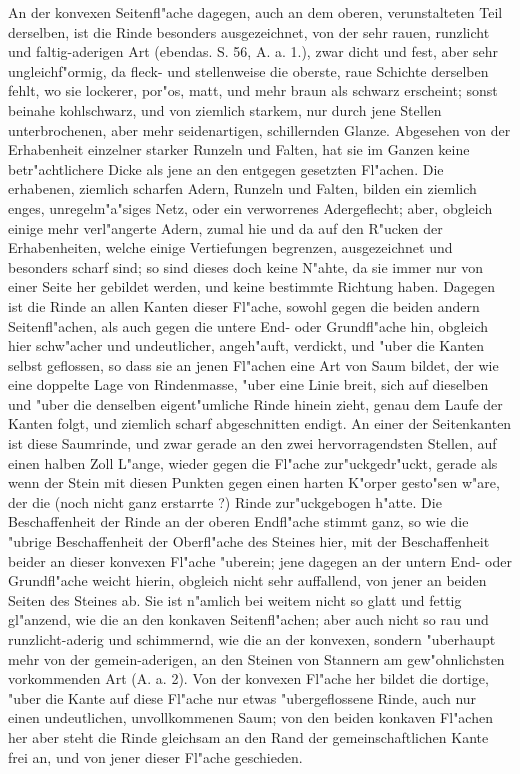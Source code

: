 \documentclass[a4paper, 11pt, oneside, german]{article}
\begin{document}
An der konvexen Seitenfl"ache dagegen, auch an dem oberen, verunstalteten Teil derselben, ist die Rinde besonders ausgezeichnet, von der sehr rauen, runzlicht und faltig-aderigen Art (ebendas. S. 56, A. a. 1.), zwar dicht und fest, aber sehr ungleichf"ormig, da fleck- und stellenweise die oberste, raue Schichte derselben fehlt, wo sie lockerer, por"os, matt, und mehr braun als schwarz erscheint; sonst beinahe kohlschwarz, und von ziemlich starkem, nur durch jene Stellen unterbrochenen, aber mehr seidenartigen, schillernden Glanze. Abgesehen von der Erhabenheit einzelner starker Runzeln und Falten, hat sie im Ganzen keine betr"achtlichere Dicke als jene an den entgegen gesetzten Fl"achen. Die erhabenen, ziemlich scharfen Adern, Runzeln und Falten, bilden ein ziemlich enges, unregelm"a"siges Netz, oder ein verworrenes Adergeflecht; aber, obgleich einige mehr verl"angerte Adern, zumal hie und da auf den R"ucken der Erhabenheiten, welche einige Vertiefungen begrenzen, ausgezeichnet und besonders scharf sind; so sind dieses doch keine N"ahte, da sie immer nur von einer Seite her gebildet werden, und keine bestimmte Richtung haben. Dagegen ist die Rinde an allen Kanten dieser Fl"ache, sowohl gegen die beiden andern Seitenfl"achen, als auch gegen die untere End- oder Grundfl"ache hin, obgleich hier schw"acher und undeutlicher, angeh"auft, verdickt, und "uber die Kanten selbst geflossen, so dass sie an jenen Fl"achen eine Art von Saum bildet, der wie eine doppelte Lage von Rindenmasse, "uber eine Linie breit, sich auf dieselben und "uber die denselben eigent"umliche Rinde hinein zieht, genau dem Laufe der Kanten folgt, und ziemlich scharf abgeschnitten endigt. An einer der Seitenkanten ist diese Saumrinde, und zwar gerade an den zwei hervorragendsten Stellen, auf einen halben Zoll L"ange, wieder gegen die Fl"ache zur"uckgedr"uckt, gerade als wenn der Stein mit diesen Punkten gegen einen harten K"orper gesto"sen w"are, der die (noch nicht ganz erstarrte ?) Rinde zur"uckgebogen h"atte. Die Beschaffenheit der Rinde an der oberen Endfl"ache stimmt ganz, so wie die "ubrige Beschaffenheit der Oberfl"ache des Steines hier, mit der Beschaffenheit beider an dieser konvexen Fl"ache "uberein; jene dagegen an der untern End- oder Grundfl"ache weicht hierin, obgleich nicht sehr auffallend, von jener an beiden Seiten des Steines ab. Sie ist n"amlich bei weitem nicht so glatt und fettig gl"anzend, wie die an den konkaven Seitenfl"achen; aber auch nicht so rau und runzlicht-aderig und schimmernd, wie die an der konvexen, sondern "uberhaupt mehr von der gemein-aderigen, an den Steinen von Stannern am gew"ohnlichsten vorkommenden Art (A. a. 2). Von der konvexen Fl"ache her bildet die dortige, "uber die Kante auf diese Fl"ache nur etwas "ubergeflossene Rinde, auch nur einen undeutlichen, unvollkommenen Saum; von den beiden konkaven Fl"achen her aber steht die Rinde gleichsam an den Rand der gemeinschaftlichen Kante frei an, und von jener dieser Fl"ache geschieden.
\end{document}
